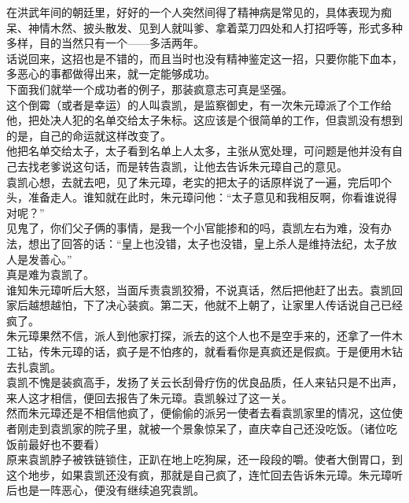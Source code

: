 \begin{multicols}{\theparacolNo}
在洪武年间的朝廷里，好好的一个人突然间得了精神病是常见的，具体表现为痴呆、神情木然、披头散发、见到人就叫爹、拿着菜刀四处和人打招呼等，形式多种多样，目的当然只有一个——多活两年。\\

话说回来，这招也是不错的，而且当时也没有精神鉴定这一招，只要你能下血本，多恶心的事都做得出来，就一定能够成功。\\

下面我们就举一个成功者的例子，那装疯意志可真是坚强。\\

这个倒霉（或者是幸运）的人叫袁凯，是监察御史，有一次朱元璋派了个工作给他，把处决人犯的名单交给太子朱标。这应该是个很简单的工作，但袁凯没有想到的是，自己的命运就这样改变了。\\

他把名单交给太子，太子看到名单上人太多，主张从宽处理，可问题是他并没有自己去找老爹说这句话，而是转告袁凯，让他去告诉朱元璋自己的意见。\\

袁凯心想，去就去吧，见了朱元璋，老实的把太子的话原样说了一遍，完后叩个头，准备走人。谁知就在此时，朱元璋问他：“太子意见和我相反啊，你看谁说得对呢？”\\

见鬼了，你们父子俩的事情，是我一个小官能掺和的吗，袁凯左右为难，没有办法，想出了回答的话：“皇上也没错，太子也没错，皇上杀人是维持法纪，太子放人是发善心。”\\

真是难为袁凯了。\\

谁知朱元璋听后大怒，当面斥责袁凯狡猾，不说真话，然后把他赶了出去。袁凯回家后越想越怕，下了决心装疯。第二天，他就不上朝了，让家里人传话说自己已经疯了。\\

朱元璋果然不信，派人到他家打探，派去的这个人也不是空手来的，还拿了一件木工钻，传朱元璋的话，疯子是不怕疼的，就看看你是真疯还是假疯。于是便用木钻去扎袁凯。\\

袁凯不愧是装疯高手，发扬了关云长刮骨疗伤的优良品质，任人来钻只是不出声，来人这才相信，便回去报告了朱元璋。袁凯躲过了这一关。\\

然而朱元璋还是不相信他疯了，便偷偷的派另一使者去看袁凯家里的情况，这位使者刚走到袁凯家的院子里，就被一个景象惊呆了，直庆幸自己还没吃饭。（诸位吃饭前最好也不要看）\\

原来袁凯脖子被铁链锁住，正趴在地上吃狗屎，还一段段的嚼。使者大倒胃口，到这个地步，如果袁凯还没有疯，那就是自己疯了，连忙回去告诉朱元璋。朱元璋听后也是一阵恶心，便没有继续追究袁凯。\\


\end{multicols}
